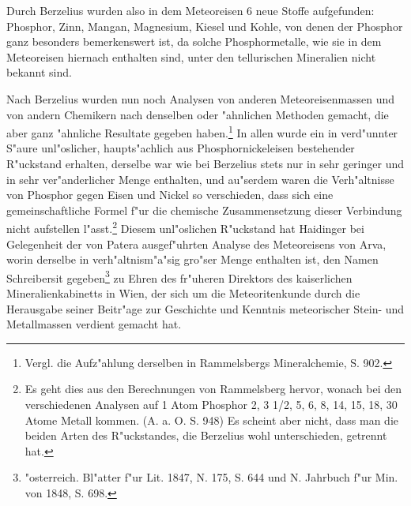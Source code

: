 \documentclass[a4paper, 11pt, oneside]{article}
\begin{document}
Durch Berzelius wurden also in dem Meteoreisen 6 neue Stoffe aufgefunden: Phosphor, Zinn, Mangan, Magnesium, Kiesel und Kohle, von denen der Phosphor ganz besonders bemerkenswert ist, da solche Phosphormetalle, wie sie in dem Meteoreisen hiernach enthalten sind, unter den tellurischen Mineralien nicht bekannt sind.

Nach Berzelius wurden nun noch Analysen von anderen Meteoreisenmassen und von andern Chemikern nach denselben oder "ahnlichen Methoden gemacht, die aber ganz "ahnliche Resultate gegeben haben.\footnote{Vergl. die Aufz"ahlung derselben in Rammelsbergs Mineralchemie, S. 902.} In allen wurde ein in verd"unnter S"aure unl"oslicher, haupts"achlich aus Phosphornickeleisen bestehender R"uckstand erhalten, derselbe war wie bei Berzelius stets nur in sehr geringer und in sehr ver"anderlicher Menge enthalten, und au"serdem waren die Verh"altnisse von Phosphor gegen Eisen und Nickel so verschieden, dass sich eine gemeinschaftliche Formel f"ur die chemische Zusammensetzung dieser Verbindung nicht aufstellen l"asst.\footnote{Es geht dies aus den Berechnungen von Rammelsberg hervor, wonach bei den verschiedenen Analysen auf 1 Atom Phosphor 2, 3 1/2, 5, 6, 8, 14, 15, 18, 30 Atome Metall kommen. (A. a. O. S. 948) Es scheint aber nicht, dass man die beiden Arten des R"uckstandes, die Berzelius wohl unterschieden, getrennt hat.} Diesem unl"oslichen R"uckstand hat Haidinger bei Gelegenheit der von Patera ausgef"uhrten Analyse des Meteoreisens von Arva, worin derselbe in verh"altnism"a"sig gro"ser Menge enthalten ist, den Namen Schreibersit gegeben\footnote{"osterreich. Bl"atter f"ur Lit. 1847, N. 175, S. 644 und N. Jahrbuch f"ur Min. von 1848, S. 698.} zu Ehren des fr"uheren Direktors des kaiserlichen Mineralienkabinetts in Wien, der sich um die Meteoritenkunde durch die Herausgabe seiner Beitr"age zur Geschichte und Kenntnis meteorischer Stein- und Metallmassen verdient gemacht hat.
\end{document}
